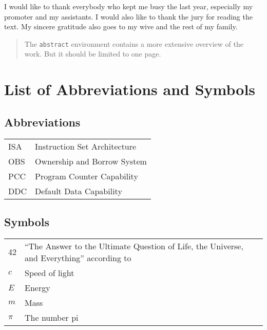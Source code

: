\documentclass[master=ecws,masteroption=ss]{kulemt}
\begin{document}
\begin{preface}
  I would like to thank everybody who kept me busy the last year,
  especially my promoter and my assistants. I would also like to thank the
  jury for reading the text. My sincere gratitude also goes to my wive and
  the rest of my family.
\end{preface}

\tableofcontents*

\begin{abstract}
  The \texttt{abstract} environment contains a more extensive overview of
  the work. But it should be limited to one page.

  \lipsum[1]
\end{abstract}

\listoffiguresandtables
\chapter{List of Abbreviations and Symbols}
\section*{Abbreviations}
\begin{flushleft}
  \renewcommand{\arraystretch}{1.1}
  \begin{tabularx}{\textwidth}{@{}p{12mm}X@{}}
    ISA   & Instruction Set Architecture \\
    OBS   & Ownership and Borrow System \\
    PCC   & Program Counter Capability \\
    DDC   & Default Data Capability \\
  \end{tabularx}
\end{flushleft}
\section*{Symbols}
\begin{flushleft}
  \renewcommand{\arraystretch}{1.1}
  \begin{tabularx}{\textwidth}{@{}p{12mm}X@{}}
    42    & ``The Answer to the Ultimate Question of Life, the Universe,
            and Everything'' according to \cite{h2g2} \\
    $c$   & Speed of light \\
    $E$   & Energy \\
    $m$   & Mass \\
    $\pi$ & The number pi \\
  \end{tabularx}
\end{flushleft}
\end{document}

